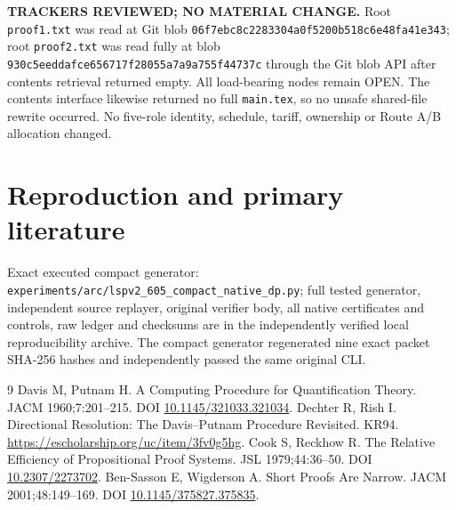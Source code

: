 \documentclass[11pt]{article}
\begin{document}
\textbf{TRACKERS REVIEWED; NO MATERIAL CHANGE.} Root \texttt{proof1.txt} was read at Git blob \texttt{06f7ebc8c2283304a0f5200b518c6e48fa41e343}; root \texttt{proof2.txt} was read fully at blob \texttt{930c5eeddafce656717f28055a7a9a755f44737c} through the Git blob API after contents retrieval returned empty. All load-bearing nodes remain OPEN. The contents interface likewise returned no full \texttt{main.tex}, so no unsafe shared-file rewrite occurred. No five-role identity, schedule, tariff, ownership or Route A/B allocation changed.

\section*{Reproduction and primary literature}
Exact executed compact generator: \texttt{experiments/arc/lspv2\_605\_compact\_native\_dp.py}; full tested generator, independent source replayer, original verifier body, all native certificates and controls, raw ledger and checksums are in the independently verified local reproducibility archive. The compact generator regenerated nine exact packet SHA-256 hashes and independently passed the same original CLI.

\begin{thebibliography}{9}
 Davis M, Putnam H. A Computing Procedure for Quantification Theory. JACM 1960;7:201--215. DOI \href{https://doi.org/10.1145/321033.321034}{10.1145/321033.321034}.
 Dechter R, Rish I. Directional Resolution: The Davis--Putnam Procedure Revisited. KR94. \url{https://escholarship.org/uc/item/3fv0g5hg}.
 Cook S, Reckhow R. The Relative Efficiency of Propositional Proof Systems. JSL 1979;44:36--50. DOI \href{https://doi.org/10.2307/2273702}{10.2307/2273702}.
 Ben-Sasson E, Wigderson A. Short Proofs Are Narrow. JACM 2001;48:149--169. DOI \href{https://doi.org/10.1145/375827.375835}{10.1145/375827.375835}.
\end{thebibliography}
\end{document}
